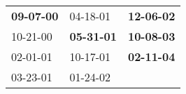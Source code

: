 \begin{supertabular}{p{0.33\columnwidth}p{0.33\columnwidth}p{0.33\columnwidth}}
 \textbf{09-07-00\textsuperscript{}} &           04-18-01\textsuperscript{} &  \textbf{12-06-02\textsuperscript{}} \\
          10-21-00\textsuperscript{} &  \textbf{05-31-01\textsuperscript{}} &  \textbf{10-08-03\textsuperscript{}} \\
          02-01-01\textsuperscript{} &           10-17-01\textsuperscript{} &  \textbf{02-11-04\textsuperscript{}} \\
          03-23-01\textsuperscript{} &           01-24-02\textsuperscript{} &                                      \\
\end{supertabular}

